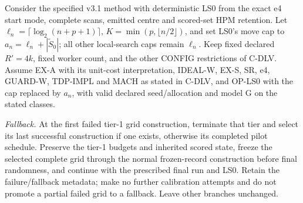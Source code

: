 \begin{proposition}\label{prop:F}
Consider the specified v3.1 method with deterministic LS0 from the exact e4 start mode, complete scans, emitted centre and scored-set HPM retention. Let $\ell_n=\lceil\log_2(n+p+1)\rceil$, $K=\min(p,\lfloor n/2\rfloor)$, and set LS0's move cap to $a_n=\ell_n+|\tilde{S}_0|$; all other local-search caps remain $\ell_n$. Keep fixed declared $R'=4k$, fixed worker count, and the other CONFIG restrictions of C-DLV. Assume EX-A with its unit-cost interpretation, IDEAL-W, EX-S, SR, e4, GUARD-W, TDP-IMPL and MACH as stated in C-DLV, and OP-LS0 with the cap replaced by $a_n$, with valid declared seed/allocation and model G on the stated classes.

\emph{Fallback.} At the first failed tier-1 grid construction, terminate that tier and select its last successful construction if one exists, otherwise its completed pilot schedule. Preserve the tier-1 budgets and inherited scored state, freeze the selected complete grid through the normal frozen-record construction before final randomness, and continue with the prescribed final run and LS0. Retain the failure/fallback metadata; make no further calibration attempts and do not promote a partial failed grid to a fallback. Leave other branches unchanged.


\end{proposition}
